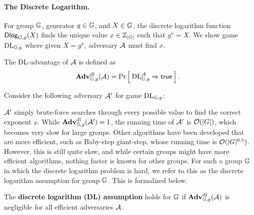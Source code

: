 \paragraph{The Discrete Logarithm.} For group $\mathbb{G}$, generator $g\in\mathbb{G}$, and $X\in\mathbb{G}$, the discrete logarithm function $\mathsf{Dlog}_{G,g}(X)$ finds the unique value $x \in {{\mathbb Z}}_{|\mathbb{G}|}$ such that $g^x = X$. We show game $\textnormal{DL}_{\mathbb{G}, g}$ where given $X = g^x$, adversary ${\mathcal A}$ must find $x$. 

\begin{center}
\end{center}

The DL-advantage of ${\mathcal A}$ is defined as 
\begin{equation*}
\mathbf{Adv}^{\mathrm{dl}}_{\mathbb{G}, g}({\mathcal A}) = \Pr\left[\: \textnormal{DL}^{\mathcal A}_{\mathbb{G}, g}\Rightarrow\mathsf{true} \:\right].
\end{equation*}

Consider the following adversary ${\mathcal A}'$ for game $\textnormal{DL}_{\mathbb{G}, g}$:

\begin{center}
\end{center}

${\mathcal A}'$ simply brute-force searches through every possible value to find the correct exponent $x$. While $\mathbf{Adv}^{\mathrm{dl}}_{\mathbb{G}, g}({\mathcal A}')=1$, the running time of ${\mathcal A}'$ is ${\cal O}(|G|)$, which becomes very slow for large groups. Other algorithms have been developed that are more efficient, such as Baby-step giant-step, whose running time is ${\cal O}(|G|^{0.5})$. However, this is still quite slow, and while certain groups might have more efficient algorithms, nothing faster is known for other groups. For such a group $\mathbb{G}$ in which the discrete logarithm problem is hard, we refer to this as the discrete logarithm assumption for group $\mathbb{G}$. This is formalized below.

\begin{definition}
	The \textbf{discrete logarithm (DL) assumption} holds for $\mathbb{G}$ if $\mathbf{Adv}^{\mathrm{dl}}_{\mathbb{G}, g}({\mathcal A})$ is negligible for all efficient adversaries ${\mathcal A}$.
\end{definition}

